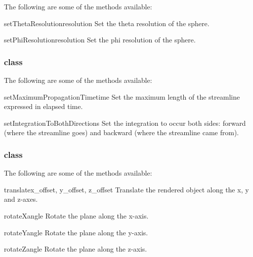 The following are some of the methods available:

\begin{methoddesc}[Sphere]{setThetaResolution}{resolution}
Set the theta resolution of the sphere.
\end{methoddesc}

\begin{methoddesc}[Sphere]{setPhiResolution}{resolution}
Set the phi resolution of the sphere.
\end{methoddesc}

\subsubsection{\StreamLineModule class}

The following are some of the methods available:

\begin{methoddesc}[StreamLineModule]{setMaximumPropagationTime}{time}
Set the maximum length of the streamline expressed in elapsed time.
\end{methoddesc}

\begin{methoddesc}[StreamLineModule]{setIntegrationToBothDirections}{}
Set the integration to occur both sides: forward (where the streamline
goes) and backward (where the streamline came from).
\end{methoddesc}

\subsubsection{\Transform class}

The following are some of the methods available:

\begin{methoddesc}[Transform]{translate}{x_offset, y_offset, z_offset}
Translate the rendered object along the x, y and z-axes.
\end{methoddesc}

\begin{methoddesc}[Transform]{rotateX}{angle}
Rotate the plane along the x-axis.
\end{methoddesc}

\begin{methoddesc}[Transform]{rotateY}{angle}
Rotate the plane along the y-axis.
\end{methoddesc}

\begin{methoddesc}[Transform]{rotateZ}{angle}
Rotate the plane along the z-axis.
\end{methoddesc}

